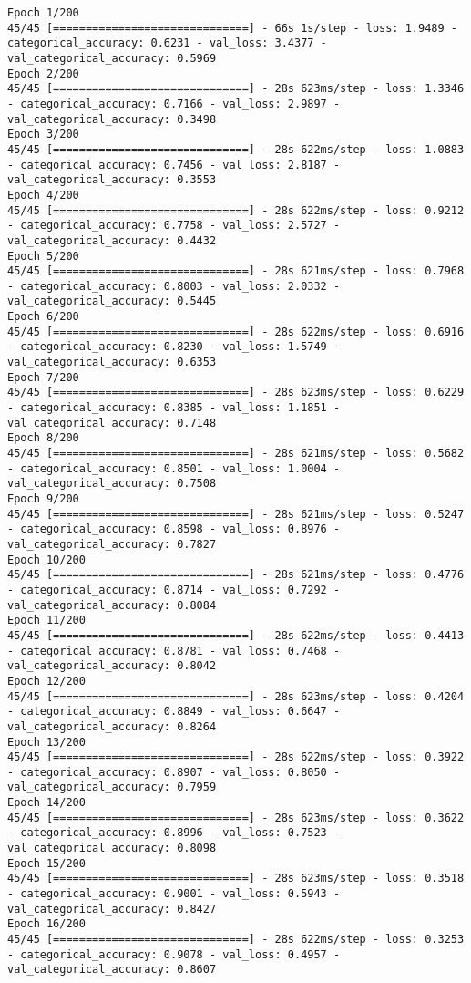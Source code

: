 \begin{lstlisting}
Epoch 1/200
45/45 [==============================] - 66s 1s/step - loss: 1.9489 - categorical_accuracy: 0.6231 - val_loss: 3.4377 - val_categorical_accuracy: 0.5969
Epoch 2/200
45/45 [==============================] - 28s 623ms/step - loss: 1.3346 - categorical_accuracy: 0.7166 - val_loss: 2.9897 - val_categorical_accuracy: 0.3498
Epoch 3/200
45/45 [==============================] - 28s 622ms/step - loss: 1.0883 - categorical_accuracy: 0.7456 - val_loss: 2.8187 - val_categorical_accuracy: 0.3553
Epoch 4/200
45/45 [==============================] - 28s 622ms/step - loss: 0.9212 - categorical_accuracy: 0.7758 - val_loss: 2.5727 - val_categorical_accuracy: 0.4432
Epoch 5/200
45/45 [==============================] - 28s 621ms/step - loss: 0.7968 - categorical_accuracy: 0.8003 - val_loss: 2.0332 - val_categorical_accuracy: 0.5445
Epoch 6/200
45/45 [==============================] - 28s 622ms/step - loss: 0.6916 - categorical_accuracy: 0.8230 - val_loss: 1.5749 - val_categorical_accuracy: 0.6353
Epoch 7/200
45/45 [==============================] - 28s 623ms/step - loss: 0.6229 - categorical_accuracy: 0.8385 - val_loss: 1.1851 - val_categorical_accuracy: 0.7148
Epoch 8/200
45/45 [==============================] - 28s 621ms/step - loss: 0.5682 - categorical_accuracy: 0.8501 - val_loss: 1.0004 - val_categorical_accuracy: 0.7508
Epoch 9/200
45/45 [==============================] - 28s 621ms/step - loss: 0.5247 - categorical_accuracy: 0.8598 - val_loss: 0.8976 - val_categorical_accuracy: 0.7827
Epoch 10/200
45/45 [==============================] - 28s 621ms/step - loss: 0.4776 - categorical_accuracy: 0.8714 - val_loss: 0.7292 - val_categorical_accuracy: 0.8084
Epoch 11/200
45/45 [==============================] - 28s 622ms/step - loss: 0.4413 - categorical_accuracy: 0.8781 - val_loss: 0.7468 - val_categorical_accuracy: 0.8042
Epoch 12/200
45/45 [==============================] - 28s 623ms/step - loss: 0.4204 - categorical_accuracy: 0.8849 - val_loss: 0.6647 - val_categorical_accuracy: 0.8264
Epoch 13/200
45/45 [==============================] - 28s 622ms/step - loss: 0.3922 - categorical_accuracy: 0.8907 - val_loss: 0.8050 - val_categorical_accuracy: 0.7959
Epoch 14/200
45/45 [==============================] - 28s 623ms/step - loss: 0.3622 - categorical_accuracy: 0.8996 - val_loss: 0.7523 - val_categorical_accuracy: 0.8098
Epoch 15/200
45/45 [==============================] - 28s 623ms/step - loss: 0.3518 - categorical_accuracy: 0.9001 - val_loss: 0.5943 - val_categorical_accuracy: 0.8427
Epoch 16/200
45/45 [==============================] - 28s 622ms/step - loss: 0.3253 - categorical_accuracy: 0.9078 - val_loss: 0.4957 - val_categorical_accuracy: 0.8607

\end{lstlisting}
